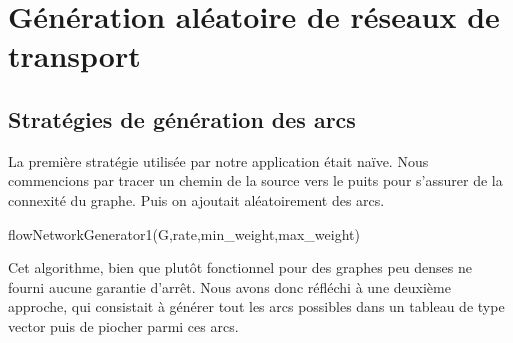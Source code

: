 \section{Génération aléatoire de réseaux de transport}

\subsection{Stratégies de génération des arcs}

La première stratégie utilisée par notre application était naïve. Nous commencions par tracer un chemin de la source vers le puits pour s'assurer de la connexité du graphe. Puis on ajoutait aléatoirement des arcs.

\begin{algorithm}[H]
  \caption{flowNetworkGenerator1(G,rate,min\_weight,max\_weight)}
\end{algorithm}

Cet algorithme, bien que \og plutôt \fg fonctionnel pour des graphes peu denses ne fourni aucune garantie d'arrêt. Nous avons donc réfléchi à une deuxième approche, qui consistait à générer tout les arcs possibles dans un tableau de type vector puis de piocher parmi ces arcs.

